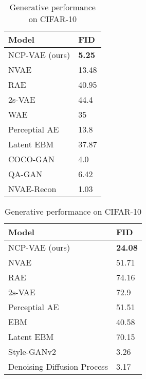 \documentclass{article} \usepackage{iclr2021_conference,times}
\begin{document}
\begin{table}[t]
\small
\begin{minipage}{.49\linewidth}
    \centering
\caption{Generative performance on CelebA-64}
\label{tab:table celeba 64}
   \begin{tabular}{ll}
      Model & FID \\
      \midrule
      NCP-VAE (ours) & \bf 5.25\\
      NVAE \citep{vahdat2020NVAE} & 13.48\\
      \hline
      RAE \citep{ghosh2020deterministicVAE} & 40.95  \\
      2s-VAE \citep{dai2018diagnosing}& 44.4 \\
      WAE \citep{tolstikhin2018wassersteinAE} & 35 \\
      Perceptial AE\citep{zhang2019perceptual} & 13.8 \\
      \hline
      Latent EBM \citep{pang2020EBMPrior} & 37.87 \\
\hline
      \hline
COCO-GAN \citep{lin2019coco} & 4.0 \\
      QA-GAN \citep{parimala2019quality} & 6.42 \\
      \hline
      NVAE-{\color{blue}Recon} \citep{vahdat2020NVAE} & 1.03\\
\bottomrule
 \end{tabular}
\end{minipage}\hfill
\begin{minipage}{.49\linewidth}
    \centering
\caption{Generative performance on CIFAR-10}
\label{tab:table cifar 10}
   \begin{tabular}{ll}
      Model & FID\\
      \midrule
      NCP-VAE (ours) & \bf 24.08 \\
      NVAE \citep{vahdat2020NVAE} & 51.71 \\
      \hline
      RAE \citep{ghosh2020deterministicVAE} & 74.16  \\
      2s-VAE \citep{dai2018diagnosing}& 72.9 \\
      Perceptial AE \citep{zhang2019perceptual} & 51.51 \\
      \hline
      EBM \citep{du2019implicit} & 40.58 \\
      Latent EBM \citep{pang2020EBMPrior} & 70.15 \\
      \hline
      \hline
      Style-GANv2 \citep{karras2020training} & 3.26 \\
      Denoising Diffusion Process \citep{ho2020denoising} & 3.17 \\ 

\end{tabular}
\end{minipage}
\end{table}
\end{document}
